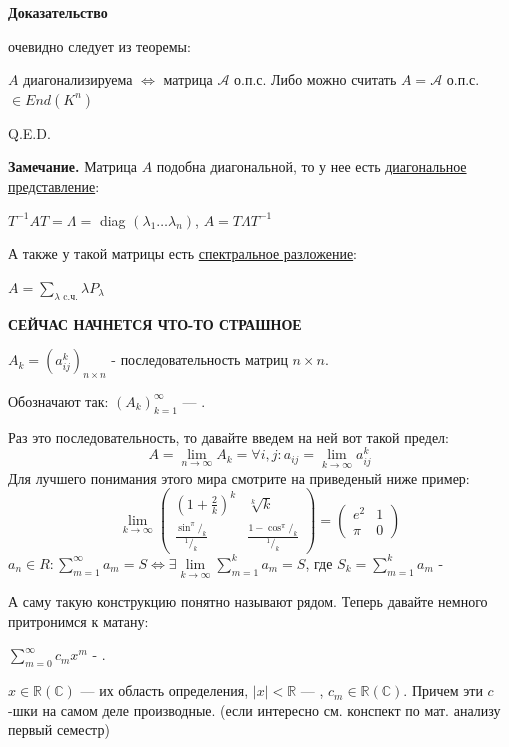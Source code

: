 \textbf{Доказательство} 

очевидно следует из теоремы: 

$A$ диагонализируема $\iff$ матрица $\mathcal{A}$ о.п.с. Либо можно считать  $A=\mathcal{A}$ о.п.с. 	$\in End (K^n)$

  \hfill Q.E.D.

\textbf{Замечание.} Матрица $A$ подобна диагональной, то у нее есть \uline{диагональное представление}:

$T^{-1}AT = \Lambda =$ diag $(\lambda_1 \dots \lambda_n)$, $A = T \Lambda T^{-1}$

А также у такой матрицы есть \uline{спектральное разложение}:

$A=\sum\limits_{\lambda  \text{ c.ч.}}\lambda P_{\lambda}$


\textbf{СЕЙЧАС НАЧНЕТСЯ ЧТО-ТО СТРАШНОЕ}

 $A_k = (a_{ij}^k)_{n\times n}$ - последовательность матриц $n\times n$.

Обозначают так: $(A_k)_{k=1}^{\infty}$  --- .

Раз это последовательность, то давайте введем на ней вот такой предел:
$$A = \lim\limits_{n\rightarrow \infty} A_k = \forall i,j: a_{ij}=\lim\limits_{k\rightarrow \infty}a_{ij}^k$$
Для лучшего понимания этого мира смотрите на приведеный ниже пример:
$$\lim\limits_{k\rightarrow \infty}\left(
 \begin{matrix}
 (1+ \frac{2}{k})^k & \sqrt[k]{k} \\
 \frac{\sin ^{\pi}/_k}{^1/_k} & \frac{1 - \cos ^{\pi}/_k}{^1/_k}
 \end{matrix}
\right) = \left(
 \begin{matrix}
 e^2 & 1 \\
 \pi & 0
 \end{matrix}
\right)$$
 $a_n \in R: \sum\limits_{m=1}^{\infty}a_m = S \Leftrightarrow
\exists \lim\limits_{k \rightarrow \infty}\sum\limits_{m=1}^k a_m=S$, где $S_k =\sum\limits_{m=1}^k a_m $ - 

А саму такую конструкцию понятно называют рядом. Теперь давайте немного притронимся к матану:

$\sum\limits_{m=0}^\infty c_mx^m$ - . 

$x\in \mathbb{R}(\mathbb{C})$ --- их область определения, $|x| < \mathbb{R}$ --- , $c_m \in \mathbb{R}(\mathbb{C})$. Причем эти $c$-шки на самом деле производные. (если интересно см. конспект по мат. анализу первый семестр)

